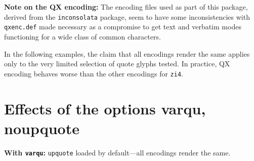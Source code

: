 \documentclass[11pt]{article}
\begin{document}
\textbf{Note on the QX encoding:} The encoding files used as part of this package, derived from the \texttt{inconsolata} package, seem to have some inconsistencies with \texttt{qxenc.def} made necessary as a compromise to get text and verbatim modes functioning for a wide class of common characters.

In the following examples, the claim that all encodings render the same applies only to the very limited selection of quote glyphs tested. In practice, QX encoding behaves worse than the other encodings for \texttt{zi4}.

\newpage
\section*{Effects of the options varqu, noupquote}
\textbf{With \texttt{varqu}:} \texttt{upquote} loaded by default---all encodings render the same.
\end{document}
